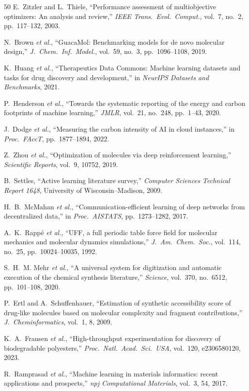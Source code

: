\documentclass[twocolumn,10pt]{article}
\begin{document}
\begin{thebibliography}{50}
E.~Zitzler and L.~Thiele, ``Performance assessment of multiobjective optimizers: An analysis and review,'' \textit{IEEE Trans.\ Evol.\ Comput.}, vol.~7, no.~2, pp.~117--132, 2003.

N.~Brown \textit{et al.}, ``GuacaMol: Benchmarking models for de novo molecular design,'' \textit{J.\ Chem.\ Inf.\ Model.}, vol.~59, no.~3, pp.~1096--1108, 2019.

K.~Huang \textit{et al.}, ``Therapeutics Data Commons: Machine learning datasets and tasks for drug discovery and development,'' in \textit{NeurIPS Datasets and Benchmarks}, 2021.

P.~Henderson \textit{et al.}, ``Towards the systematic reporting of the energy and carbon footprints of machine learning,'' \textit{JMLR}, vol.~21, no.~248, pp.~1--43, 2020.

J.~Dodge \textit{et al.}, ``Measuring the carbon intensity of AI in cloud instances,'' in \textit{Proc.\ FAccT}, pp.~1877--1894, 2022.

Z.~Zhou \textit{et al.}, ``Optimization of molecules via deep reinforcement learning,'' \textit{Scientific Reports}, vol.~9, 10752, 2019.

B.~Settles, ``Active learning literature survey,'' \textit{Computer Sciences Technical Report 1648}, University of Wisconsin--Madison, 2009.

H.~B.~McMahan \textit{et al.}, ``Communication-efficient learning of deep networks from decentralized data,'' in \textit{Proc.\ AISTATS}, pp.~1273--1282, 2017.

A.~K.~Rapp\'{e} \textit{et al.}, ``UFF, a full periodic table force field for molecular mechanics and molecular dynamics simulations,'' \textit{J.\ Am.\ Chem.\ Soc.}, vol.~114, no.~25, pp.~10024--10035, 1992.

S.~H.~M. Mehr \textit{et al.}, ``A universal system for digitization and automatic execution of the chemical synthesis literature,'' \textit{Science}, vol.~370, no.~6512, pp.~101--108, 2020.

P.~Ertl and A.~Schuffenhauer, ``Estimation of synthetic accessibility score of drug-like molecules based on molecular complexity and fragment contributions,'' \textit{J.\ Cheminformatics}, vol.~1, 8, 2009.

K.~A.~Fransen \textit{et al.}, ``High-throughput experimentation for discovery of biodegradable polyesters,'' \textit{Proc.\ Natl.\ Acad.\ Sci.\ USA}, vol.~120, e2306580120, 2023.

R.~Ramprasad \textit{et al.}, ``Machine learning in materials informatics: recent applications and prospects,'' \textit{npj Computational Materials}, vol.~3, 54, 2017.

\end{thebibliography}
\end{document}
